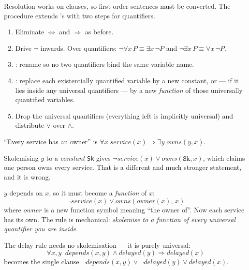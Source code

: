 Resolution works on clauses, so first-order sentences must be converted. The
procedure extends 's with two steps for quantifiers.

\begin{enumerate}[leftmargin=2.2em, itemsep=2pt, topsep=4pt]
  \item Eliminate $\Leftrightarrow$ and $\Rightarrow$ as before.
  \item Drive $\neg$ inwards. Over quantifiers:
        $\neg \forall x\, P \equiv \exists x\, \neg P$ and
        $\neg \exists x\, P \equiv \forall x\, \neg P$.
  \item {}: rename so no two quantifiers bind the same
        variable name.
  \item {}: replace each existentially quantified variable by a new
        constant, or --- if it lies inside any universal quantifiers --- by a new
        \emph{function} of those universally quantified variables.
  \item Drop the universal quantifiers (everything left is implicitly universal)
        and distribute $\vee$ over $\wedge$.
\end{enumerate}

\begin{examplebox}
``Every service has an owner'' is
$\forall x \; \mathit{service}(x) \Rightarrow \exists y \; \mathit{owns}(y, x)$.

\smallskip
Skolemising $y$ to a \emph{constant} \texttt{Sk} gives
$\neg\mathit{service}(x) \vee \mathit{owns}(\texttt{Sk}, x)$, which claims one
person owns every service. That is a different and much stronger statement, and it
is wrong.

\smallskip
$y$ depends on $x$, so it must become a \emph{function} of $x$:
\[
  \neg \mathit{service}(x) \vee \mathit{owns}(\mathit{owner}(x),\, x)
\]
where $\mathit{owner}$ is a new function symbol meaning ``the owner of''. Now each
service has its own. The rule is mechanical: \emph{skolemise to a function of every
universal quantifier you are inside}.
\end{examplebox}

The delay rule needs no skolemisation --- it is purely universal:
\[
  \forall x, y \;\; \mathit{depends}(x,y) \wedge \mathit{delayed}(y)
  \Rightarrow \mathit{delayed}(x)
\]
becomes the single clause
$\neg \mathit{depends}(x,y) \vee \neg \mathit{delayed}(y) \vee
\mathit{delayed}(x)$.

